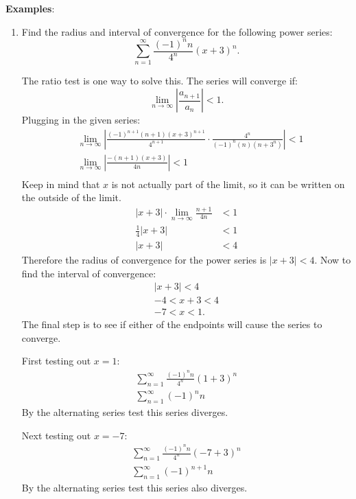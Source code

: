 \documentclass[12pt]{article}
\begin{document}
\noindent \textbf{Examples}:
\begin{enumerate}
    \item Find the radius and interval of convergence for the following power series:
          \[ \sum_{n=1}^\infty \frac{(-1)^n n}{4^n} (x+3)^n. \]

          The ratio test is one way to solve this. The series will converge if:
          \[ \lim_{n \to \infty} \left| \frac{a_{n+1}}{a_n} \right| < 1. \]
          Plugging in the given series:
          \begin{align*}
               & \lim_{n \to \infty} \left| \frac{(-1)^{n+1}(n+1)(x+3)^{n+1}}{4^{n+1}} \cdot \frac{4^n}{(-1)^n (n)(n+3^n)} \right| < 1 \\[6pt]
               & \lim_{n \to \infty} \left| \frac{-(n+1)(x+3)}{4n} \right| < 1                                                         \\[6pt]
          \end{align*}
          Keep in mind that $x$ is not actually part of the limit, so it can be written on the outside of the limit.
          \begin{align*}
              |x+3| \cdot \lim_{n \to \infty} \frac{n+1}{4n} & < 1 \\[6pt]
              \frac{1}{4} |x+3|                              & < 1 \\[6pt]
              |x+3|                                          & < 4
          \end{align*}
          Therefore the radius of convergence for the power series is $|x+3| < 4$. Now to find the interval of convergence:
          \begin{gather*}
              |x+3| < 4 \\
              -4 < x+3 < 4 \\
              -7 < x < 1.
          \end{gather*}
          The final step is to see if either of the endpoints will cause the series to converge.

          First testing out $x=1$:
          \begin{gather*}
              \sum_{n=1}^\infty \frac{(-1)^n n}{4^n} (1+3)^n \\[6pt]
              \sum_{n=1}^\infty (-1)^n n
          \end{gather*}
          By the alternating series test this series diverges.

          Next testing out $x=-7$:
          \begin{align*}
              \sum_{n=1}^\infty \frac{(-1)^n n}{4^n} (-7+3)^n \\[6pt]
              \sum_{n=1}^\infty (-1)^{n+1} n
          \end{align*}
          By the alternating series test this series also diverges.


\end{enumerate}
\end{document}
